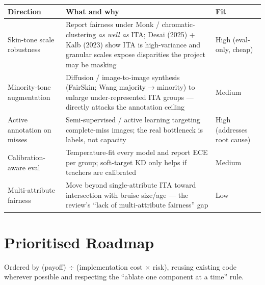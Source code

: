 \documentclass[11pt]{article}
\begin{document}
\begin{center}
\small
\begin{tabular}{P{3.6cm} P{7.2cm} P{2.6cm}}
\toprule
Direction & What and why & Fit \\
\midrule
Skin-tone scale robustness & Report fairness under Monk / chromatic-clustering \emph{as well as} ITA; Desai (2025) + Kalb (2023) show ITA is high-variance and granular scales expose disparities the project may be masking & High (eval-only, cheap) \\
Minority-tone augmentation & Diffusion / image-to-image synthesis (FairSkin; Wang majority$\to$minority) to enlarge under-represented ITA groups --- directly attacks the annotation ceiling & Medium \\
Active annotation on misses & Semi-supervised / active learning targeting complete-miss images; the real bottleneck is labels, not capacity & High (addresses root cause) \\
Calibration-aware eval & Temperature-fit every model and report ECE per group; soft-target KD only helps if teachers are calibrated & Medium \\
Multi-attribute fairness & Move beyond single-attribute ITA toward intersection with bruise size/age --- the review's ``lack of multi-attribute fairness'' gap & Low \\
\bottomrule
\end{tabular}
\end{center}

\section{Prioritised Roadmap}

Ordered by (payoff) $\div$ (implementation cost $\times$ risk), reusing existing code wherever
possible and respecting the ``ablate one component at a time'' rule.
\end{document}
